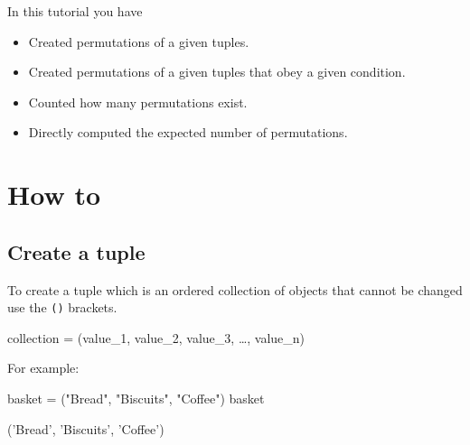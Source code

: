 \begin{note}
In this tutorial you have
\begin{itemize}
\item 

Created permutations of a given tuples.

\item 

Created permutations of a given tuples that obey a given condition.

\item 

Counted how many permutations exist.

\item 

Directly computed the expected number of permutations.

\end{itemize}
\end{note}





\section{How to}
\label{\detokenize{tools-for-mathematics/05-combinations-permutations/how/main:how}}\label{\detokenize{tools-for-mathematics/05-combinations-permutations/how/main::doc}}

\subsection{Create a tuple}
\label{sec:create_a_tuple}

To create a tuple which is an ordered collection of objects that cannot be
changed use the \texttt{()} brackets.


\begin{pyin}
collection = (value_1, value_2, value_3, …, value_n)
\end{pyin}



For example:




\begin{pyin}
basket = ("Bread", "Biscuits", "Coffee")
basket
\end{pyin}





\begin{raw}
('Bread', 'Biscuits', 'Coffee')
\end{raw}

